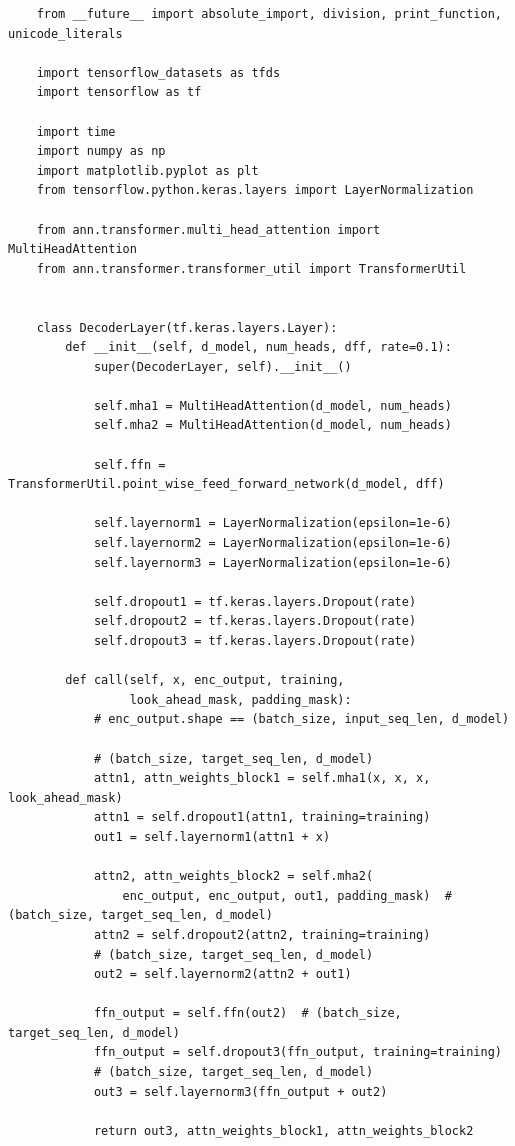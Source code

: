 \documentclass{article}
\begin{document}
\begin{lstlisting}
    from __future__ import absolute_import, division, print_function, unicode_literals

    import tensorflow_datasets as tfds
    import tensorflow as tf
    
    import time
    import numpy as np
    import matplotlib.pyplot as plt
    from tensorflow.python.keras.layers import LayerNormalization
    
    from ann.transformer.multi_head_attention import MultiHeadAttention
    from ann.transformer.transformer_util import TransformerUtil
    
    
    class DecoderLayer(tf.keras.layers.Layer):
        def __init__(self, d_model, num_heads, dff, rate=0.1):
            super(DecoderLayer, self).__init__()
    
            self.mha1 = MultiHeadAttention(d_model, num_heads)
            self.mha2 = MultiHeadAttention(d_model, num_heads)
    
            self.ffn = TransformerUtil.point_wise_feed_forward_network(d_model, dff)
    
            self.layernorm1 = LayerNormalization(epsilon=1e-6)
            self.layernorm2 = LayerNormalization(epsilon=1e-6)
            self.layernorm3 = LayerNormalization(epsilon=1e-6)
    
            self.dropout1 = tf.keras.layers.Dropout(rate)
            self.dropout2 = tf.keras.layers.Dropout(rate)
            self.dropout3 = tf.keras.layers.Dropout(rate)
    
        def call(self, x, enc_output, training,
                 look_ahead_mask, padding_mask):
            # enc_output.shape == (batch_size, input_seq_len, d_model)
    
            # (batch_size, target_seq_len, d_model)
            attn1, attn_weights_block1 = self.mha1(x, x, x, look_ahead_mask)
            attn1 = self.dropout1(attn1, training=training)
            out1 = self.layernorm1(attn1 + x)
    
            attn2, attn_weights_block2 = self.mha2(
                enc_output, enc_output, out1, padding_mask)  # (batch_size, target_seq_len, d_model)
            attn2 = self.dropout2(attn2, training=training)
            # (batch_size, target_seq_len, d_model)
            out2 = self.layernorm2(attn2 + out1)
    
            ffn_output = self.ffn(out2)  # (batch_size, target_seq_len, d_model)
            ffn_output = self.dropout3(ffn_output, training=training)
            # (batch_size, target_seq_len, d_model)
            out3 = self.layernorm3(ffn_output + out2)
    
            return out3, attn_weights_block1, attn_weights_block2    
\end{lstlisting}
\end{document}

